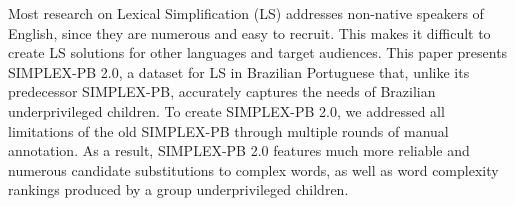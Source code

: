 Most research on Lexical Simplification (LS) addresses non-native speakers of English, since they are numerous and easy to recruit. This makes it difficult to create LS solutions for other languages and target audiences. This paper presents SIMPLEX-PB 2.0, a dataset for LS in Brazilian Portuguese that, unlike its predecessor SIMPLEX-PB, accurately captures the needs of Brazilian underprivileged children. To create SIMPLEX-PB 2.0, we addressed all limitations of the old SIMPLEX-PB through multiple rounds of manual annotation. As a result, SIMPLEX-PB 2.0 features much more reliable and numerous candidate substitutions to complex words, as well as word complexity rankings produced by a group underprivileged children.
